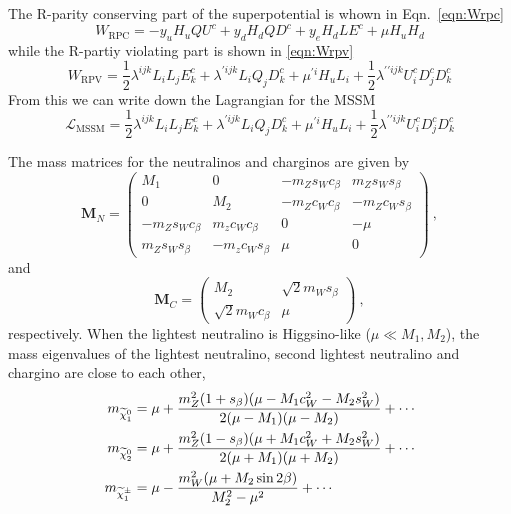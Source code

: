 The R-parity conserving part of the superpotential is whown in Eqn.~\ref{eqn:Wrpc}
\begin{equation}
W_{\mathrm{RPC}} = - y_u H_u Q U^c + y_dH_d Q D^c + y_e H_d L E^c +
\mu H_uH_d
\label{eqn:Wrpc}
\end{equation}
while the R-partiy violating part is shown in \ref{eqn:Wrpv}
\begin{equation}
W_{\mathrm{RPV}} =\frac{1}{2}\lambda^{ijk}L_iL_jE_k^c +
\lambda^{\prime ijk} L_iQ_jD_k^c + \mu^{\prime i}H_uL_i +
\frac{1}{2}\lambda^{\prime\prime ijk}U_i^cD_j^cD_k^c
\label{eqn:Wrpv}
\end{equation}
From this we can write down the Lagrangian for the MSSM
\begin{equation}
\mathcal L_{\mathrm{MSSM}}=\frac{1}{2}\lambda^{ijk}L_iL_jE_k^c +
\lambda^{\prime ijk} L_iQ_jD_k^c + \mu^{\prime i}H_uL_i +
\frac{1}{2}\lambda^{\prime\prime ijk}U_i^cD_j^cD_k^c
\label{eqn:Wrpv}
\end{equation}



The mass matrices for the neutralinos and charginos are given by
\begin{equation}
\mathbf{M}_N =\left (  \begin{matrix}
M_1 & 0 & -m_Zs_Wc_{\beta} & m_Zs_Ws_{\beta} \\
0& M_2 & -m_Zc_Wc_{\beta} & -m_Zc_Ws_{\beta} \\
-m_Zs_Wc_{\beta}& m_zc_Wc_{\beta} & 0 & -\mu\\
m_Zs_Ws_{\beta}& -m_zc_Ws_{\beta} & \mu & 0
\end{matrix}\right)~,
\end{equation}
and 
\begin{equation}
\mathbf{M}_C =\left (  \begin{matrix}
M_2 & \sqrt{2}m_Ws_{\beta}\\
 \sqrt{2}m_Wc_{\beta}& \mu
\end{matrix}\right)~,
\end{equation}
respectively.
When the lightest neutralino is Higgsino-like ($\mu \ll M_1, M_2$), the
mass eigenvalues of the lightest neutralino, second lightest neutralino and chargino are close to
each other,
\begin{align}
m_{\widetilde{\chi}^{0}_1} &= \mu + \frac{m_Z^2(1+s_{\beta})(\mu - M_1c_W^2-M_2s_W^2)}{2(\mu-M_1)(\mu-M_2)} + \cdots\\
m_{\widetilde{\chi}^{0}_2} &= \mu + \frac{m_Z^2(1-s_{\beta})(\mu + M_1c_W^2+M_2s_W^2)}{2(\mu+M_1)(\mu+M_2)} + \cdots\\
m_{\widetilde{\chi}^{\pm}_1} &= \mu - \frac{m_W^2(\mu + M_2\sin 2\beta)}{M_2^2-\mu^2} + \cdots
\end{align}

